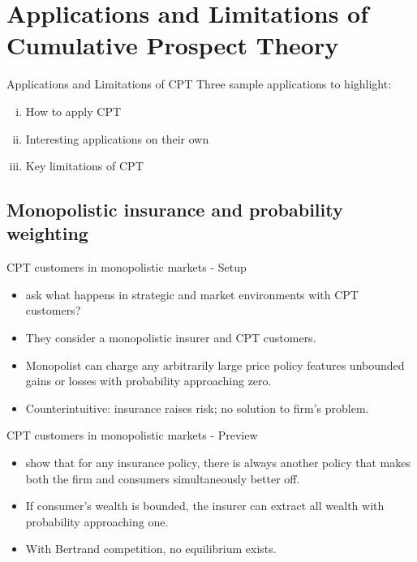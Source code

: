 \section{Applications and Limitations of Cumulative Prospect Theory}



\begin{frame}{Applications and Limitations of CPT}
    Three sample applications to highlight:\bigskip
        \begin{enumerate}[i)]
            \item How to apply CPT\bigskip
            \item Interesting applications on their own\bigskip
            \item Key limitations of CPT\bigskip
        \end{enumerate}
    \end{frame}



\subsection{Monopolistic insurance and probability weighting}
    \begin{frame}{CPT customers in monopolistic markets - Setup}
        \begin{itemize}
            \item \citet{AzevedoGottlieb2012} ask what happens in strategic and market environments with CPT customers?\bigskip
            \item They consider a monopolistic insurer and CPT customers.\bigskip
                \item Monopolist can charge any arbitrarily large price policy features unbounded gains or losses with probability approaching zero.\bigskip
                \item Counterintuitive: insurance raises risk; no solution to firm's problem.\medskip
        \end{itemize}
    \end{frame}

    \begin{frame}{CPT customers in monopolistic markets - Preview}
        \begin{itemize}
            \item \citet{AzevedoGottlieb2012} show that for any insurance policy, there is always another policy that makes both the firm and consumers simultaneously better off.\bigskip
            \item If consumer's wealth is bounded, the insurer can extract all wealth with probability approaching one.\bigskip
            \item With Bertrand competition, no equilibrium exists.\bigskip
        \end{itemize}
    \end{frame}



